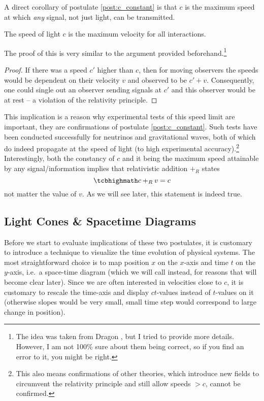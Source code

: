 A direct corollary of postulate \ref{post:c_constant} is that $c$ is the maximum speed at which \emph{any} signal, not just light, can be transmitted.
\begin{prop}%
	The speed of light $c$ is the maximum velocity for all interactions.
\end{prop}
The proof of this is very similar to the argument provided beforehand.\footnote{The idea was taken from Dragon \cite{dragon_geometry_srt}, but I tried to provide more details. However, I am not 100\% sure about them being correct, so if you find an error to it, you might be right.}
\begin{proof}
	If there was a speed $c'$ higher than $c$, then for moving observers the speeds would be dependent on their velocity $v$ and observed to be $c' + v$. Consequently, one could single out an observer sending signals at $c'$ and this observer would be at rest -- a violation of the relativity principle.
\end{proof}

This implication is a reason why experimental tests of this speed limit are important, they are confirmations of postulate \ref{post:c_constant}. Such tests have been conducted successfully for neutrinos and gravitational waves, both of which do indeed propagate at the speed of light (to high experimental accuracy).\footnote{This also means confirmations of other theories, which introduce new fields to circumvent the relativity principle and still allow speeds $> c$, cannot be confirmed.} Interestingly, both the constancy of $c$ and it being the maximum speed attainable by any signal/information implies that relativistic addition $+_R$ states
\begin{equation}
	\eqbox{
	c +_R v = c
	}
\end{equation}
not matter the value of $v$. As we will see later, this statement is indeed true.



		\subsection{Light Cones \& Spacetime Diagrams}
Before we start to evaluate implications of these two postulates, it is customary to introduce a technique to visualize the time evolution of physical systems. The most straightforward choice is to map position $x$ on the $x$-axis and time $t$ on the $y$-axis, i.e.~a space-time diagram (which we will call  instead, for reasons that will become clear later). Since we are often interested in velocities close to $c$, it is customary to rescale the time-axis and display $ct$-values instead of $t$-values on it (otherwise slopes would be very small, small time step would correspond to large change in position).

